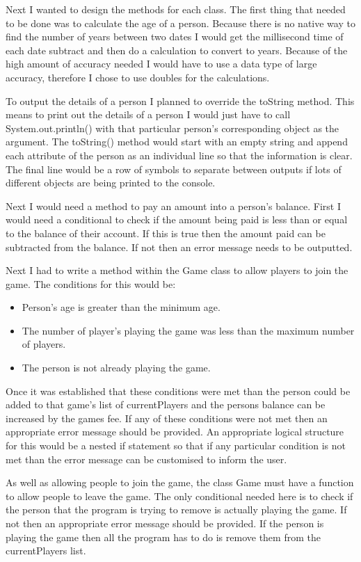 \documentclass[a4paper]{article}
\begin{document}
Next I wanted to design the methods for each class. The first thing that needed to be done was to calculate the age of a person. Because there is no native way to find the number of years between two dates I would get the millisecond time of each date subtract and then do a calculation to convert to years. Because of the high amount of accuracy needed I would have to use a data type of large accuracy, therefore I chose to use doubles for the calculations.

To output the details of a person I planned to override the toString method. This means to print out the details of a person I would just have to call System.out.println() with that particular person's corresponding object as the argument. The toString() method would start with an empty string and append each attribute of the person as an individual line so that the information is clear. The final line would be a row of symbols to separate between outputs if lots of different objects are being printed to the console. 

Next I would need a method to pay an amount into a person's balance. First I would need a conditional to check if the amount being paid is less than or equal to the balance of their account. If this is true then the amount paid can be subtracted from the balance. If not then an error message needs to be outputted.

Next I had to write a method within the Game class to allow players to join the game. The conditions for this would be: \begin{itemize}
\item Person's age is greater than the minimum age.
\item The number of player's playing the game was less than the maximum number of players.
\item The person is not already playing the game.
\end{itemize}
Once it was established that these conditions were met than the person could be added to that game's list of currentPlayers and the persons balance can be increased by the games fee. If any of these conditions were not met then an appropriate error message should be provided. An appropriate logical structure for this would be a nested if statement so that if any particular condition is not met than the error message can be customised to inform the user.

As well as allowing people to join the game, the class Game must have a function to allow people to leave the game. The only conditional needed here is to check if the person that the program is trying to remove is actually playing the game. If not then an appropriate error message should be provided. If the person is playing the game then all the program has to do is remove them from the currentPlayers list.
\end{document}
